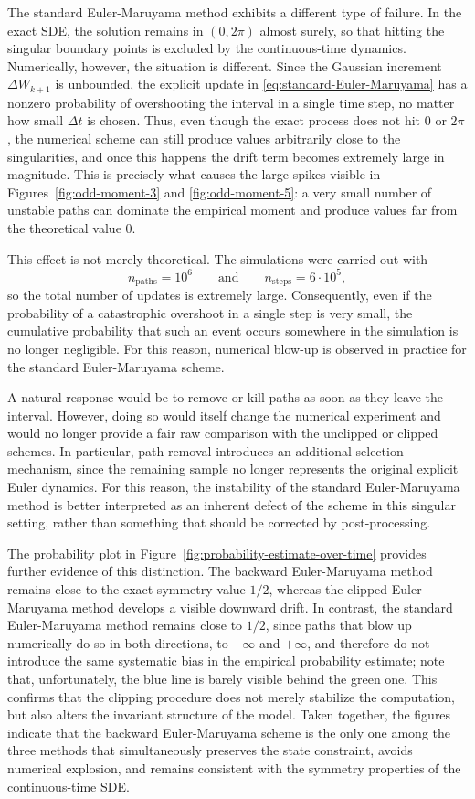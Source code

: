 \documentclass[11pt]{article}
\newcommand{\1}{\mathbbm{1}}
\theoremstyle{plain}
\theoremstyle{definition}
\theoremstyle{remark}
\begin{document}
The standard Euler-Maruyama method exhibits a different type of failure. In the exact SDE, the solution remains in $(0,2\pi)$ almost surely, so that hitting the singular boundary points is excluded by the continuous-time dynamics. Numerically, however, the situation is different. Since the Gaussian increment $\Delta W_{k+1}$ is unbounded, the explicit update in \eqref{eq:standard-Euler-Maruyama} has a nonzero probability of overshooting the interval in a single time step, no matter how small $\Delta t$ is chosen. Thus, even though the exact process does not hit $0$ or $2\pi$, the numerical scheme can still produce values arbitrarily close to the singularities, and once this happens the drift term becomes extremely large in magnitude. This is precisely what causes the large spikes visible in Figures~\ref{fig:odd-moment-3} and \ref{fig:odd-moment-5}: a very small number of unstable paths can dominate the empirical moment and produce values far from the theoretical value $0$.

This effect is not merely theoretical. The simulations were carried out with
\[
n_{\text{paths}}=10^6
\qquad\text{and}\qquad
n_{\text{steps}}=6\cdot 10^5,
\]
so the total number of updates is extremely large. Consequently, even if the probability of a catastrophic overshoot in a single step is very small, the cumulative probability that such an event occurs somewhere in the simulation is no longer negligible. For this reason, numerical blow-up is observed in practice for the standard Euler-Maruyama scheme.

A natural response would be to remove or kill paths as soon as they leave the interval. However, doing so would itself change the numerical experiment and would no longer provide a fair raw comparison with the unclipped or clipped schemes. In particular, path removal introduces an additional selection mechanism, since the remaining sample no longer represents the original explicit Euler dynamics. For this reason, the instability of the standard Euler-Maruyama method is better interpreted as an inherent defect of the scheme in this singular setting, rather than something that should be corrected by post-processing.

The probability plot in Figure~\ref{fig:probability-estimate-over-time} provides further evidence of this distinction. The backward Euler-Maruyama method remains close to the exact symmetry value $1/2$, whereas the clipped Euler-Maruyama method develops a visible downward drift. In contrast, the standard Euler-Maruyama method remains close to $1/2$, since paths that blow up numerically do so in both directions, to $-\infty$ and $+\infty$, and therefore do not introduce the same systematic bias in the empirical probability estimate; note that, unfortunately, the blue line is barely visible behind the green one. This confirms that the clipping procedure does not merely stabilize the computation, but also alters the invariant structure of the model. Taken together, the figures indicate that the backward Euler-Maruyama scheme is the only one among the three methods that simultaneously preserves the state constraint, avoids numerical explosion, and remains consistent with the symmetry properties of the continuous-time SDE.
\end{document}
